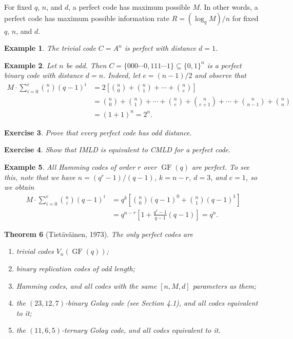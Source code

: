 \documentclass[10pt]{article}
\DeclareMathOperator{\GF}{GF}
\theoremstyle{newstyle}
\newtheorem{thm}{Theorem}[subsection]
\newtheorem{exercise}[thm]{Exercise}
\newtheorem{exmp}[thm]{Example}
\begin{document}
For fixed $q$, $n$, and $d$, a perfect code has maximum possible $M$. In other words, a perfect code 
has maximum possible information rate $R = (\log_q M)/n$ for fixed $q$, $n$, and $d$. 

\begin{exmp}
The trivial code $C = A^n$ is perfect with distance $d = 1$.
\end{exmp}

\begin{exmp}
Let $n$ be odd. Then $C = \{000 \cdots 0, 111\cdots 1\} \subseteq \{0, 1\}^n$ is a perfect 
binary code with distance $d = n$. Indeed, let $e = (n-1)/2$ and observe that 
\begin{align*}
    M \cdot \sum_{i=0}^e \binom{n}{i} (q-1)^i 
    &= 2 \left[ \binom n0 + \binom n1 + \cdots + \binom ne \right] \\
    &= \binom n0 + \binom n1 + \cdots + \binom ne + \binom n{e+1} + \cdots + \binom n{n-1} + \binom nn \\
    &= (1+1)^n = 2^n.
\end{align*}
\end{exmp}

\begin{exercise}
Prove that every perfect code has odd distance.
\end{exercise}

\begin{exercise}
Show that IMLD is equivalent to CMLD for a perfect code. 
\end{exercise}

\begin{exmp}
All Hamming codes of order $r$ over $\GF(q)$ are perfect. To see this, note that 
we have $n = (q^r - 1)/(q-1)$, $k = n-r$, $d = 3$, and $e = 1$, so we obtain 
\begin{align*}
    M \cdot \sum_{i=0}^e \binom{n}{i} (q-1)^i 
    &= q^k \left[ \binom n0 (q-1)^0 + \binom n1 (q-1)^1 \right] \\
    &= q^{n-r} \left[ 1 + \frac{q^r-1}{q-1} (q-1) \right] = q^n. 
\end{align*}
\end{exmp}

\begin{thm}[Tiet\"av\"ainen, 1973]
The only perfect codes are 
\begin{enumerate}[(1)]
    \item trivial codes $V_n(\GF(q))$;
    \item binary replication codes of odd length;
    \item Hamming codes, and all codes with the same $[n, M, d]$ parameters as them;
    \item the $(23, 12, 7)$-binary Golay code (see Section 4.1), and all codes equivalent to it;
    \item the $(11, 6, 5)$-ternary Golay code, and all codes equivalent to it.
\end{enumerate}
\end{thm}
\end{document}
